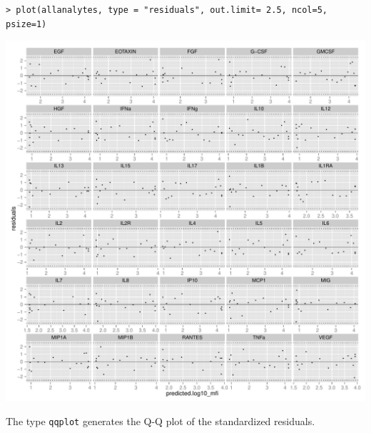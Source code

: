 \documentclass[11pt]{article}\usepackage[]{graphicx}\usepackage[]{color}
\makeatletter
\def\maxwidth{ %
  \ifdim\Gin@nat@width>\linewidth
    \linewidth
  \else
    \Gin@nat@width
  \fi
}
\newenvironment{kframe}{%
 \def\at@end@of@kframe{}%
 \ifinner\ifhmode%
  \def\at@end@of@kframe{\end{minipage}}%
  \begin{minipage}{\columnwidth}%
 \fi\fi%
 \def\FrameCommand##1{\hskip\@totalleftmargin \hskip-\fboxsep
 \colorbox{shadecolor}{##1}\hskip-\fboxsep
     \hskip-\linewidth \hskip-\@totalleftmargin \hskip\columnwidth}%
 \MakeFramed {\advance\hsize-\width
   \@totalleftmargin\z@ \linewidth\hsize
   \@setminipage}}%
 {\par\unskip\endMakeFramed%
 \at@end@of@kframe}
\newenvironment{knitrout}{}{} %
\makeatother
\begin{document}
\begin{knitrout}
\color{fgcolor}\begin{kframe}
\begin{verbatim}
> plot(allanalytes, type = "residuals", out.limit= 2.5, ncol=5, psize=1)
\end{verbatim}
\end{kframe}

{\centering \includegraphics[width=\maxwidth]{./unnamed-chunk-50-1} 

}



\end{knitrout}

\newpage
\noindent The type {\tt qqplot} generates the Q-Q plot of the 
standardized residuals.
\end{document}
